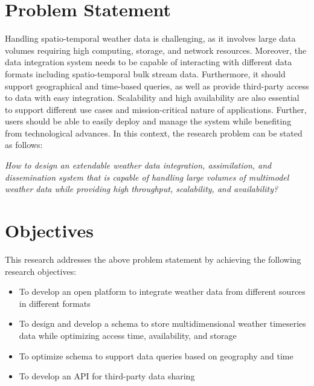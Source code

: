 \section{Problem Statement}
Handling spatio-temporal weather data is challenging, as it involves large data volumes requiring high computing, storage, and network resources. Moreover, the data integration system needs to be capable of interacting with different data formats including spatio-temporal bulk stream data. Furthermore, it should support geographical and time-based queries, as well as provide third-party access to data with easy integration. Scalability and high availability are also essential to support different use cases and mission-critical nature of applications.
Further, users should be able to easily deploy and manage the system while benefiting from technological advances. %
In this context, the research problem can be stated as follows:
 
\emph{How to design an extendable weather data integration, assimilation, and dissemination system that is capable of handling large volumes of multimodel weather data while providing high throughput, scalability, and availability?}

\section{Objectives}
This research addresses the above problem statement by achieving the following research objectives:
\begin{itemize}
    \item To develop an open platform to integrate weather data from different sources in different formats
    \item To design and develop a schema to store multidimensional weather timeseries data while optimizing access time, availability, and storage
    \item To optimize schema to support data queries based on geography and time
    \item To develop an API for third-party data sharing
\end{itemize}
